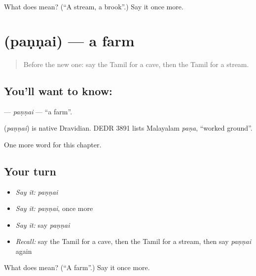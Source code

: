 \begin{tcolorbox}[breakable,colback=teal!4,colframe=teal!35!black,title={Before you move on}]
What does  mean? (\textquotedblleft{}A stream, a brook\textquotedblright{}.) Say it once more.
\end{tcolorbox}
\section[\texorpdfstring{\ta{பண்ணை} (paṇṇai)}{பண்ணை (paṇṇai)}]{ (paṇṇai) — a farm}

\label{lesson:TA-C175-pannai}



\begin{quote}
Before the new one: say the Tamil for a cave, then the Tamil for a stream.
\end{quote}

\subsection*{You'll want to know: }
\textbf{} — \emph{paṇṇai} — \textquotedblleft{}a farm\textquotedblright{}.

\begin{cousinweb}
\textbf{} (\emph{paṇṇai}) is native Dravidian. DEDR 3891 lists Malayalam \emph{paṇa}, \textquotedblleft{}worked ground\textquotedblright{}.
\end{cousinweb}

\begin{grammarlens}[title={What you've built}]
One more word for this chapter.
\end{grammarlens}

\subsection*{Your turn}
\begin{itemize}
\raggedright
  \item \emph{Say it:} \emph{paṇṇai}
  \item \emph{Say it:} \emph{paṇṇai}, once more
  \item \emph{Say it:} say \emph{paṇṇai}
  \item \emph{Recall:} say the Tamil for a cave, then the Tamil for a stream, then say \emph{paṇṇai} again
\end{itemize}

\begin{tcolorbox}[breakable,colback=teal!4,colframe=teal!35!black,title={Before you move on}]
What does  mean? (\textquotedblleft{}A farm\textquotedblright{}.) Say it once more.
\end{tcolorbox}
